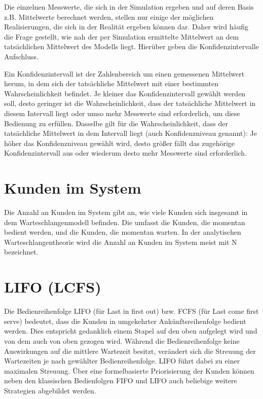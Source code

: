 Die einzelnen Messwerte, die sich in der Simulation ergeben und auf
deren Basis z.B. Mittelwerte
berechnet werden, stellen nur einige der möglichen Realisierungen,
die sich in der Realität ergeben können dar. Daher wird häufig die
Frage gestellt, wie nah der per Simulation ermittelte Mittelwert
an dem tatsächlichen Mittelwert des Modells liegt. Hierüber geben
die Konfidenzintervalle Aufschluss.


Ein Konfidenzintervall ist der Zahlenbereich um einen gemessenen Mittelwert
herum, in dem sich der tatsächliche Mittelwert mit einer bestimmten
Wahrscheinlichkeit befindet. Je kleiner das Konfidenzintervall gewählt
werden soll, desto geringer ist die Wahrscheinlichkeit, dass der tatsächliche
Mittelwert in diesem Intervall liegt oder umso mehr Messwerte sind erforderlich,
um diese Bedienung zu erfüllen. Dasselbe gilt für die Wahrscheinlichkeit,
dass der tatsächliche Mittelwert in dem Intervall liegt (auch Konfidenzniveau genannt):
Je höher das Konfidenzniveau gewählt wird, desto größer fällt das zugehörige
Konfidenzintervall aus oder wiederum desto mehr Messwerte sind erforderlich.

\section*{Kunden im System}


Die Anzahl an Kunden im System gibt an, wie viele Kunden sich insgesamt in dem Warteschlangenmodell
befinden. Die umfasst die Kunden, die momentan bedient werden, und die Kunden, die momentan warten.
In der analytischen Warteschlangentheorie wird die
Anzahl an Kunden im System meist mit N bezeichnet.

\section*{LIFO (LCFS)}


Die Bedienreihenfolge LIFO (für Last in first out) bzw. FCFS (für Last come first serve) bedeutet,
dass die Kunden in umgekehrter Ankünftsreihenfolge bedient werden. Dies entspricht gedanklich einem Stapel
auf den oben aufgelegt wird und von dem auch von oben gezogen wird.
Während die Bedienreihenfolge keine Auswirkungen auf die mittlere Wartezeit besitzt, verändert sich
die Streuung der Wartezeiten je nach gewählter Bedienreihenfolge. LIFO führt dabei zu einer maximalen Streuung.
Über eine formelbasierte Priorisierung der Kunden können neben den klassischen Bedienfolgen FIFO und LIFO auch
beliebige weitere Strategien abgebildet werden.

